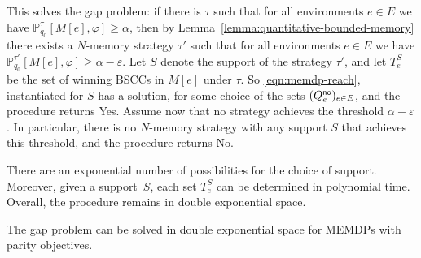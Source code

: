 \documentclass[a4paper,USenglish,cleveref, autoref, thm-restate]{lipics-v2021}
\let\epsilon\varepsilon
\newcommand*{\pr}{\mathbb{P}}
\begin{document}
This solves the gap problem:
if there is $\tau$ such that for all environments $e \in E$ we have $\pr_{q_0}^{\tau}[M[e],\varphi]\geq \alpha$,
then by Lemma~\ref{lemma:quantitative-bounded-memory} there exists a $N$-memory strategy $\tau'$ 
such that for all environments $e \in E$ we have $\pr_{q_0}^{\tau'}[M[e],\varphi]\geq \alpha-\epsilon$.
Let $S$ denote the support of the strategy $\tau'$, and let $T_e^S$ be the set of winning BSCCs in $M[e]$ under $\tau$.
So \eqref{eqn:memdp-reach}, instantiated for $S$
has a solution, for some choice of the sets $(Q^{\textsf{no}}_e)_{e\in E}$, and
the procedure returns \textsf{Yes}.
Assume now that no strategy achieves the threshold $\alpha-\epsilon$. In particular, there is no $N$-memory strategy
with any support $S$ that 
achieves this threshold, and the procedure returns \textsf{No}.

There are an exponential number of possibilities for the choice of support. Moreover, given a support~$S$,
each set $T^S_e$ can be determined in polynomial time. Overall, the procedure remains in double exponential space.


  \begin{theorem}
    The gap problem can be solved in double exponential space for MEMDPs with parity objectives.
  \end{theorem}





\end{document}
